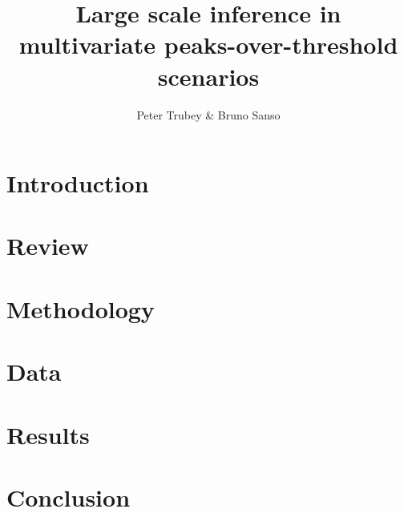 \documentclass{article}
\title{Large scale inference in multivariate peaks-over-threshold scenarios}
\author{Peter Trubey \& Bruno Sanso}
\begin{document}
\maketitle

\begin{abstract}
    
\end{abstract}

\section{Introduction}


\section{Review}


\section{Methodology}


\section{Data}


\section{Results}


\section{Conclusion}


\appendix




\end{document}
